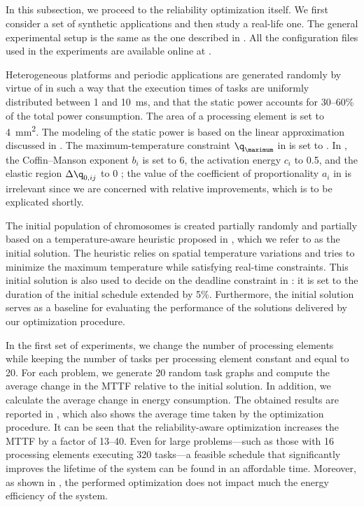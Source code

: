 \subsection{\resultstitle}

In this subsection, we proceed to the reliability optimization itself. We first
consider a set of synthetic applications and then study a real-life one. The
general experimental setup is the same as the one described in
. All the configuration files used in the
experiments are available online at \cite{eslab2012}.

Heterogeneous platforms and periodic applications are generated randomly by
virtue of  \cite{dick1998} in such a way that the execution times of
tasks are uniformly distributed between 1 and 10~ms, and that the static power
accounts for 30--60\% of the total power consumption. The area of a processing
element is set to 4~mm\textsuperscript{2}. The modeling of the static power is
based on the linear approximation discussed in
. The maximum-temperature constraint
$\q_\maximum$ in  is set to . In
, the Coffin--Manson exponent $b_i$ is set to
6, the activation energy $c_i$ to 0.5, and the elastic region $\Delta \q_{0,
ij}$ to 0 \cite{jedec2016}; the value of the coefficient of proportionality
$a_i$ in  is irrelevant since we are concerned
with relative improvements, which is to be explicated shortly.

The initial population of chromosomes is created partially randomly and
partially based on a temperature-aware heuristic proposed in \cite{xie2006},
which we refer to as the initial solution. The heuristic relies on spatial
temperature variations and tries to minimize the maximum temperature while
satisfying real-time constraints. This initial solution is also used to decide
on the deadline constraint \period in : it is
set to the duration of the initial schedule extended by 5\%. Furthermore, the
initial solution serves as a baseline for evaluating the performance of the
solutions delivered by our optimization procedure.

In the first set of experiments, we change the number of processing elements \np
while keeping the number of tasks \nt per processing element constant and equal
to 20. For each problem, we generate 20 random task graphs and compute the
average change in the \ac{MTTF} relative to the initial solution. In addition,
we calculate the average change in energy consumption. The obtained results are
reported in , which also shows the average time
taken by the optimization procedure. It can be seen that the reliability-aware
optimization increases the \ac{MTTF} by a factor of 13--40. Even for large
problems---such as those with 16 processing elements executing 320 tasks---a
feasible schedule that significantly improves the lifetime of the system can be
found in an affordable time. Moreover, as shown in
, the performed optimization does not impact much
the energy efficiency of the system.

